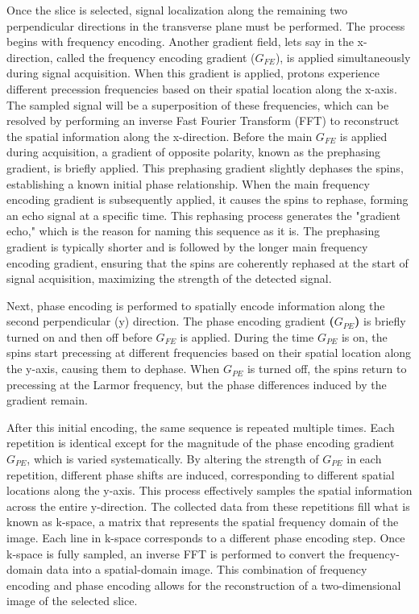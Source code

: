 \documentclass{micro-econ-thesis}
\begin{document}
Once the slice is selected, signal localization along the remaining two perpendicular directions in the transverse plane must be performed. The process begins with frequency encoding. Another gradient field, lets say in the x-direction, called the frequency encoding gradient (\textbf{$G_{FE}$}), is applied simultaneously during signal acquisition. When this gradient is applied, protons experience different precession frequencies based on their spatial location along the x-axis. The sampled signal will be a superposition of these frequencies, which can be resolved by performing an inverse Fast Fourier Transform (FFT) to reconstruct the spatial information along the x-direction. Before the main \textbf{$G_{FE}$} is applied during acquisition, a gradient of opposite polarity, known as the prephasing gradient, is briefly applied. This prephasing gradient slightly dephases the spins, establishing a known initial phase relationship. When the main frequency encoding gradient is subsequently applied, it causes the spins to rephase, forming an echo signal at a specific time. This rephasing process generates the "gradient echo," which is the reason for naming this sequence as it is. The prephasing gradient is typically shorter and is followed by the longer main frequency encoding gradient, ensuring that the spins are coherently rephased at the start of signal acquisition, maximizing the strength of the detected signal.

Next, phase encoding is performed to spatially encode information along the second perpendicular (y) direction. The phase encoding gradient \textbf{($G_{PE}$)} is briefly turned on and then off before $G_{FE}$ is applied. During the time $G_{PE}$ is on, the spins start precessing at different frequencies based on their spatial location along the y-axis, causing them to dephase. When $G_{PE}$ is turned off, the spins return to precessing at the Larmor frequency, but the phase differences induced by the gradient remain. 

After this initial encoding, the same sequence is repeated multiple times. Each repetition is identical except for the magnitude of the phase encoding gradient $G_{PE}$, which is varied systematically. By altering the strength of $G_{PE}$ in each repetition, different phase shifts are induced, corresponding to different spatial locations along the y-axis. This process effectively samples the spatial information across the entire y-direction. The collected data from these repetitions fill what is known as k-space, a matrix that represents the spatial frequency domain of the image. Each line in k-space corresponds to a different phase encoding step. Once k-space is fully sampled, an inverse FFT is performed to convert the frequency-domain data into a spatial-domain image. This combination of frequency encoding and phase encoding allows for the reconstruction of a two-dimensional image of the selected slice.
\end{document}
